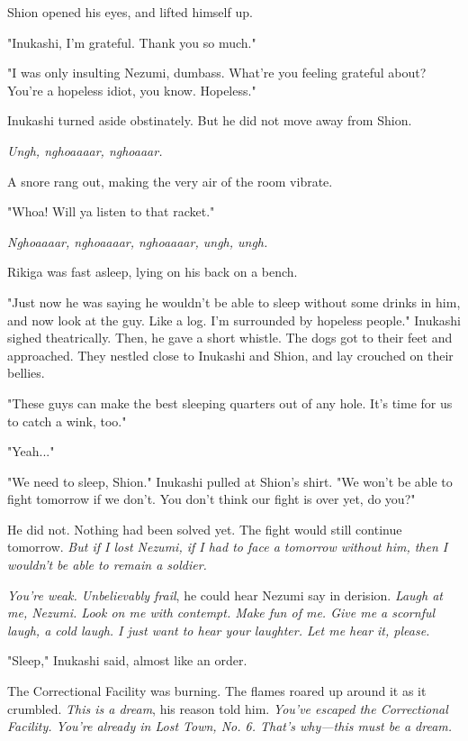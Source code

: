Shion opened his eyes, and lifted himself up.

"Inukashi, I'm grateful. Thank you so much."

"I was only insulting Nezumi, dumbass. What're you feeling grateful
about? You're a hopeless idiot, you know. Hopeless."

Inukashi turned aside obstinately. But he did not move away from Shion.

\emph{Ungh, nghoaaaar, nghoaaar.}

A snore rang out, making the very air of the room vibrate.

"Whoa! Will ya listen to that racket."

\emph{Nghoaaaar, nghoaaaar, nghoaaaar, ungh, ungh.}

Rikiga was fast asleep, lying on his back on a bench.

"Just now he was saying he wouldn't be able to sleep without some drinks
in him, and now look at the guy. Like a log. I'm surrounded by hopeless
people." Inukashi sighed theatrically. Then, he gave a short whistle.
The dogs got to their feet and approached. They nestled close to
Inukashi and Shion, and lay crouched on their bellies.

"These guys can make the best sleeping quarters out of any hole. It's
time for us to catch a wink, too."

"Yeah..."

"We need to sleep, Shion." Inukashi pulled at Shion's shirt. "We won't
be able to fight tomorrow if we don't. You don't think our fight is over
yet, do you?"

He did not. Nothing had been solved yet. The fight would still continue
tomorrow. \emph{But if I lost Nezumi, if I had to face a tomorrow without him,
then I wouldn't be able to remain a soldier.}

\emph{You're weak. Unbelievably frail}, he could hear Nezumi say in derision.
\emph{Laugh at me, Nezumi. Look on me with contempt. Make fun of me. Give me a
scornful laugh, a cold laugh. I just want to hear your laughter. Let me
hear it, please.}

"Sleep," Inukashi said, almost like an order.

\myspace

The Correctional Facility was burning. The flames roared up around it as
it crumbled. \emph{This is a dream}, his reason told him. \emph{You've escaped the
Correctional Facility. You're already in Lost Town, No. 6. That's
why---this must be a dream.}

